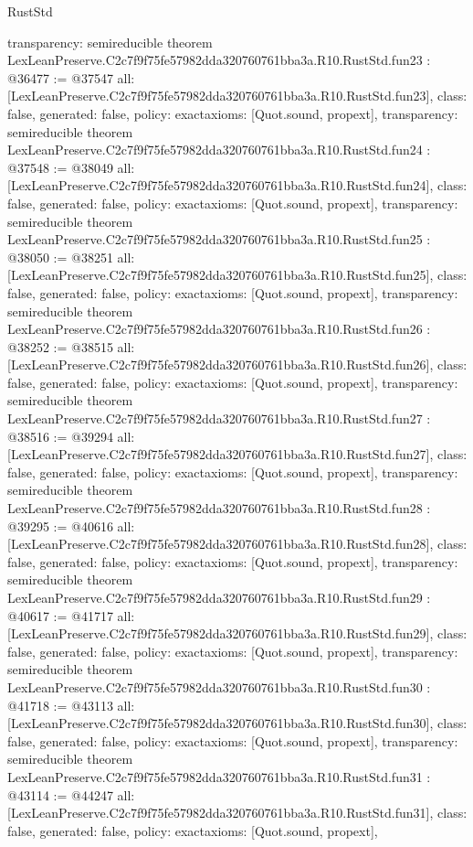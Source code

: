\begin{lexlean}{RustStd}
\begin{coremodule}
{  transparency: semireducible
}
theorem LexLeanPreserve.C2c7f9f75fe57982dda320760761bba3a.R10.RustStd.fun23 : @36477 := @37547 {
  all: [LexLeanPreserve.C2c7f9f75fe57982dda320760761bba3a.R10.RustStd.fun23],
  class: false,
  generated: false,
  policy: exact{axioms: [Quot.sound, propext]},
  transparency: semireducible
}
theorem LexLeanPreserve.C2c7f9f75fe57982dda320760761bba3a.R10.RustStd.fun24 : @37548 := @38049 {
  all: [LexLeanPreserve.C2c7f9f75fe57982dda320760761bba3a.R10.RustStd.fun24],
  class: false,
  generated: false,
  policy: exact{axioms: [Quot.sound, propext]},
  transparency: semireducible
}
theorem LexLeanPreserve.C2c7f9f75fe57982dda320760761bba3a.R10.RustStd.fun25 : @38050 := @38251 {
  all: [LexLeanPreserve.C2c7f9f75fe57982dda320760761bba3a.R10.RustStd.fun25],
  class: false,
  generated: false,
  policy: exact{axioms: [Quot.sound, propext]},
  transparency: semireducible
}
theorem LexLeanPreserve.C2c7f9f75fe57982dda320760761bba3a.R10.RustStd.fun26 : @38252 := @38515 {
  all: [LexLeanPreserve.C2c7f9f75fe57982dda320760761bba3a.R10.RustStd.fun26],
  class: false,
  generated: false,
  policy: exact{axioms: [Quot.sound, propext]},
  transparency: semireducible
}
theorem LexLeanPreserve.C2c7f9f75fe57982dda320760761bba3a.R10.RustStd.fun27 : @38516 := @39294 {
  all: [LexLeanPreserve.C2c7f9f75fe57982dda320760761bba3a.R10.RustStd.fun27],
  class: false,
  generated: false,
  policy: exact{axioms: [Quot.sound, propext]},
  transparency: semireducible
}
theorem LexLeanPreserve.C2c7f9f75fe57982dda320760761bba3a.R10.RustStd.fun28 : @39295 := @40616 {
  all: [LexLeanPreserve.C2c7f9f75fe57982dda320760761bba3a.R10.RustStd.fun28],
  class: false,
  generated: false,
  policy: exact{axioms: [Quot.sound, propext]},
  transparency: semireducible
}
theorem LexLeanPreserve.C2c7f9f75fe57982dda320760761bba3a.R10.RustStd.fun29 : @40617 := @41717 {
  all: [LexLeanPreserve.C2c7f9f75fe57982dda320760761bba3a.R10.RustStd.fun29],
  class: false,
  generated: false,
  policy: exact{axioms: [Quot.sound, propext]},
  transparency: semireducible
}
theorem LexLeanPreserve.C2c7f9f75fe57982dda320760761bba3a.R10.RustStd.fun30 : @41718 := @43113 {
  all: [LexLeanPreserve.C2c7f9f75fe57982dda320760761bba3a.R10.RustStd.fun30],
  class: false,
  generated: false,
  policy: exact{axioms: [Quot.sound, propext]},
  transparency: semireducible
}
theorem LexLeanPreserve.C2c7f9f75fe57982dda320760761bba3a.R10.RustStd.fun31 : @43114 := @44247 {
  all: [LexLeanPreserve.C2c7f9f75fe57982dda320760761bba3a.R10.RustStd.fun31],
  class: false,
  generated: false,
  policy: exact{axioms: [Quot.sound, propext]},
}
\end{coremodule}
\end{lexlean}
